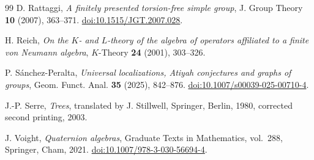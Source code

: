 \documentclass[11pt,a4paper,reqno]{amsart}
\numberwithin{equation}{section}
\theoremstyle{remark}
\begin{document}
\begin{thebibliography}{99}
 D. Rattaggi, \emph{A finitely presented torsion-free simple group}, J. Group Theory \textbf{10} (2007), 363--371. \href{https://doi.org/10.1515/JGT.2007.028}{doi:10.1515/JGT.2007.028}.

 H. Reich,
\emph{On the \(K\)- and \(L\)-theory of the algebra of operators affiliated to a finite von Neumann algebra},
\(K\)-Theory \textbf{24} (2001), 303--326.

 P. S\'anchez-Peralta, \emph{Universal localizations, Atiyah conjectures and graphs of groups},
Geom. Funct. Anal. \textbf{35} (2025), 842--876.
\href{https://doi.org/10.1007/s00039-025-00710-4}{doi:10.1007/s00039-025-00710-4}.

 J.-P. Serre, \emph{Trees}, translated by J. Stillwell,
Springer, Berlin, 1980, corrected second printing, 2003.

 J. Voight, \emph{Quaternion algebras},
Graduate Texts in Mathematics, vol.~288, Springer, Cham, 2021.
\href{https://doi.org/10.1007/978-3-030-56694-4}{doi:10.1007/978-3-030-56694-4}.
\end{thebibliography}
\end{document}
